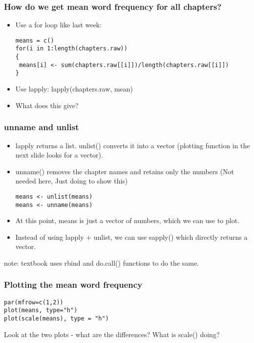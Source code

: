 \documentclass{beamer}
\begin{document}
\begin{frame}[fragile]
\frametitle{How do we get mean word frequency for all chapters?}
\begin{itemize}
\item Use a for loop like last week:
\tiny
\begin{verbatim}
means = c()
for(i in 1:length(chapters.raw))
{
 means[i] <- sum(chapters.raw[[i]])/length(chapters.raw[[i]]) 
}
\end{verbatim} \pause
\normalsize
\item Use lapply: lapply(chapters.raw, mean)
\item What does this give? 
\end{itemize}
\end{frame}

\begin{frame}[fragile]
\frametitle{unname and unlist}
\begin{itemize}
\item lapply returns a list. unlist() converts it into a vector (plotting function in the next slide looks for a vector).
\item unname() removes the chapter names and retains only the numbers (Not needed here, Just doing to show this)
\tiny
\begin{verbatim}
means <- unlist(means)
means <- unname(means)
\end{verbatim} \small
\item At this point, means is just a vector of numbers, which we can use to plot.
\pause \item Instead of using lapply + unlist, we can use sapply() which directly returns a vector. 
\end{itemize}
\normalsize note: textbook uses rbind and do.call() functions to do the same. 
\end{frame}

\begin{frame}[fragile]
\frametitle{Plotting the mean word frequency}
\tiny
\begin{verbatim}
par(mfrow=c(1,2)) 
plot(means, type="h")
plot(scale(means), type = "h")
\end{verbatim} \normalsize
Look at the two plots - what are the differences? What is scale() doing? 
\end{frame}
\end{document}
